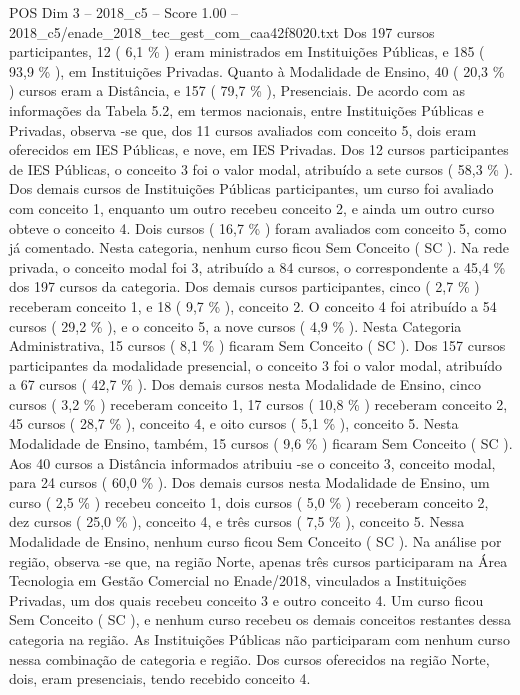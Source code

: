 \begin{textsample}{POS Dim 3 – 2018\_c5 – Score 1.00 – 2018\_c5/enade\_2018\_tec\_gest\_com\_caa42f8020.txt}
Dos 197 cursos participantes, 12 ( 6,1 \% ) eram ministrados em Instituições Públicas, e 185 ( 93,9 \% ), em Instituições Privadas.
Quanto à Modalidade de Ensino, 40 ( 20,3 \% ) cursos eram a Distância, e 157 ( 79,7 \% ), Presenciais.
De acordo com as informações da Tabela 5.2, em termos nacionais, entre Instituições Públicas e Privadas, observa -se que, dos 11 cursos avaliados com conceito 5, dois eram oferecidos em IES Públicas, e nove, em IES Privadas.
Dos 12 cursos participantes de IES Públicas, o conceito 3 foi o valor modal, atribuído a sete cursos ( 58,3 \% ).
Dos demais cursos de Instituições Públicas participantes, um curso foi avaliado com conceito 1, enquanto um outro recebeu conceito 2, e ainda um outro curso obteve o conceito 4.
Dois cursos ( 16,7 \% ) foram avaliados com conceito 5, como já comentado.
Nesta categoria, nenhum curso ficou Sem Conceito ( SC ).
Na rede privada, o conceito modal foi 3, atribuído a 84 cursos, o correspondente a 45,4 \% dos 197 cursos da categoria.
Dos demais cursos participantes, cinco ( 2,7 \% ) receberam conceito 1, e 18 ( 9,7 \% ), conceito 2.
O conceito 4 foi atribuído a 54 cursos ( 29,2 \% ), e o conceito 5, a nove cursos ( 4,9 \% ).
Nesta Categoria Administrativa, 15 cursos ( 8,1 \% ) ficaram Sem Conceito ( SC ).
Dos 157 cursos participantes da modalidade presencial, o conceito 3 foi o valor modal, atribuído a 67 cursos ( 42,7 \% ).
Dos demais cursos nesta Modalidade de Ensino, cinco cursos ( 3,2 \% ) receberam conceito 1, 17 cursos ( 10,8 \% ) receberam conceito 2, 45 cursos ( 28,7 \% ), conceito 4, e oito cursos ( 5,1 \% ), conceito 5.
Nesta Modalidade de Ensino, também, 15 cursos ( 9,6 \% ) ficaram Sem Conceito ( SC ).
Aos 40 cursos a Distância informados atribuiu -se o conceito 3, conceito modal, para 24 cursos ( 60,0 \% ).
Dos demais cursos nesta Modalidade de Ensino, um curso ( 2,5 \% ) recebeu conceito 1, dois cursos ( 5,0 \% ) receberam conceito 2, dez cursos ( 25,0 \% ), conceito 4, e três cursos ( 7,5 \% ), conceito 5.
Nessa Modalidade de Ensino, nenhum curso ficou Sem Conceito ( SC ).
Na análise por região, observa -se que, na região Norte, apenas três cursos participaram na Área Tecnologia em Gestão Comercial no Enade/2018, vinculados a Instituições Privadas, um dos quais recebeu conceito 3 e outro conceito 4.
Um curso ficou Sem Conceito ( SC ), e nenhum curso recebeu os demais conceitos restantes dessa categoria na região.
As Instituições Públicas não participaram com nenhum curso nessa combinação de categoria e região.
Dos cursos oferecidos na região Norte, dois, eram presenciais, tendo recebido conceito 4.

\end{textsample}
